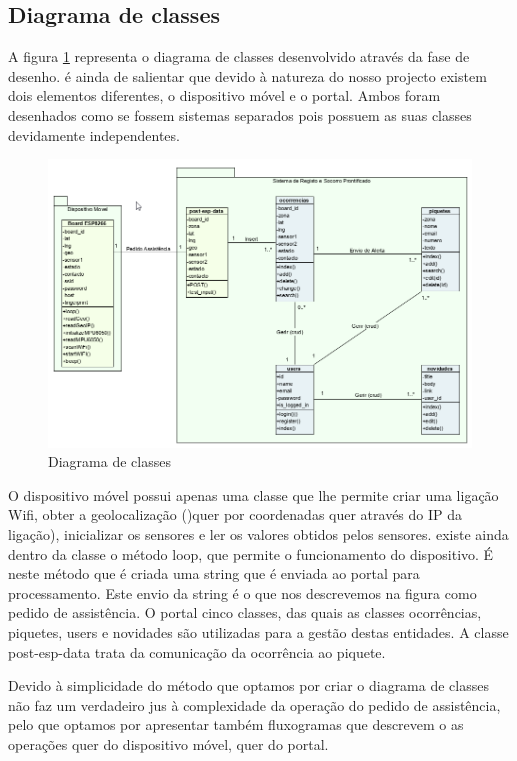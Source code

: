 \FloatBarrier\subsection{Diagrama de classes}

A figura \ref{fig:diagrama_classes} representa o diagrama de classes desenvolvido através da fase de desenho. é ainda de salientar que devido à natureza do nosso projecto existem dois elementos diferentes, o dispositivo móvel e o portal. Ambos foram desenhados como se fossem sistemas separados pois possuem as suas classes devidamente independentes.


\begin{figure}[!htb]
	\centering
	\includegraphics[width=\textwidth]{figuras/diagrama_classes.png}
	\caption{Diagrama de classes}
	\label{fig:diagrama_classes}
\end{figure}

O dispositivo móvel possui apenas uma classe que lhe permite criar uma ligação Wifi, obter a geolocalização ()quer por coordenadas quer através do IP da ligação), inicializar os sensores e ler os valores obtidos pelos sensores. 
existe ainda dentro da classe o método loop, que permite o funcionamento do dispositivo. É neste método que é criada uma string que é enviada ao portal para processamento. Este envio da string é o que nos descrevemos na figura como pedido de assistência.
O portal cinco classes, das quais as classes ocorrências, piquetes, users e novidades são utilizadas para a gestão destas entidades. A classe post-esp-data trata da comunicação da ocorrência ao piquete.

Devido à simplicidade do método que optamos por criar o diagrama de classes não faz um verdadeiro jus à complexidade  da operação do pedido de assistência, pelo que optamos por apresentar também fluxogramas que descrevem o as operações quer do dispositivo móvel, quer do portal.

